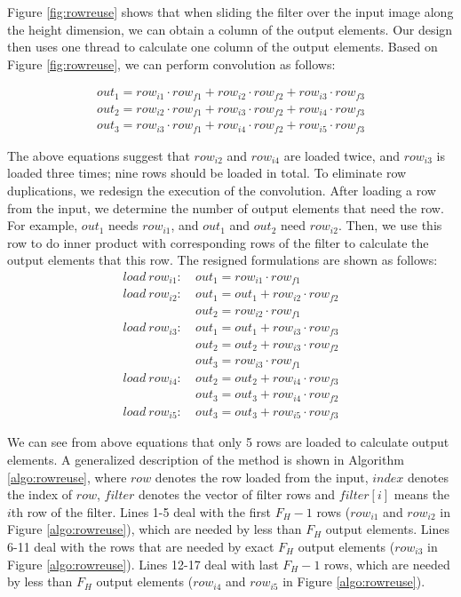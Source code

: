 Figure \ref{fig:rowreuse} shows that when sliding the filter over the input image along the height dimension, we can obtain a column of the output elements. Our design then uses one thread to calculate one column of the output elements. Based on Figure \ref{fig:rowreuse},
we can perform convolution as follows:

\begin{gather*}
  out_1=row_{i1} \cdot row_{f1} + row_{i2} \cdot row_{f2} + row_{i3} \cdot row_{f3} \\
out_{2}=row_{i2} \cdot row_{f1} + row_{i3} \cdot row_{f2} + row_{i4} \cdot row_{f3} \\
	out_{3}=row_{i3} \cdot row_{f1} + row_{i4} \cdot row_{f2} + row_{i5} \cdot row_{f3}
\end{gather*}

The above equations suggest that $row_{i2}$ and $row_{i4}$ are loaded twice, and $row_{i3}$ is loaded three times; nine rows should be loaded in total. To eliminate row duplications, we redesign the execution of the convolution. After loading a row from the input, we determine the number of output elements that need the row. For example, $out_1$ needs $row_{i1}$, and $out_1$ and $out_2$ need $row_{i2}$. Then, we use
this row to do inner product with corresponding rows of the filter to calculate the output elements that this row. The resigned formulations are shown as follows:
\begin{equation}\nonumber
\begin{aligned}
load\ row_{i1}:
&\ out_1=row_{i1} \cdot row_{f1} \\
load\ row_{i2}:
&\ out_1 = out_1+row_{i2} \cdot row_{f2}\\
&\ out_2=row_{i2} \cdot row_{f1}\\
load\ row_{i3}:
&\ out_1 = out_1+row_{i3} \cdot row_{f3}\\
&\ out_2 = out_2+row_{i3} \cdot row_{f2}\\
&\ out_{3}=row_{i3} \cdot row_{f1}\\
load\ row_{i4}:
&\ out_2=out_2+row_{i4} \cdot row_{f3} \\
&\ out_3=out_3+row_{i4} \cdot row_{f2}\\
load\ row_{i5}:
&\ out_3=out_3+row_{i5} \cdot row_{f3}
\end{aligned}	
\end{equation}



We can see from above equations that only 5 rows are loaded to calculate output elements. A generalized description of the method is
shown in Algorithm \ref{algo:rowreuse}, where $row$ denotes the row loaded from the input, $index$ denotes the index of $row$, $filter$ denotes
the vector of filter rows and $filter[i]$ means the $i$th row of the filter. Lines 1-5 deal with the first $F_H-1$ rows ($row_{i1}$ and $row_{i2}$ in Figure \ref{algo:rowreuse}), which
are needed by less than $F_H$ output elements. Lines 6-11 deal with the rows that are needed by exact $F_H$ output elements ($row_{i3}$ in
Figure \ref{algo:rowreuse}). Lines 12-17 deal with last $F_H-1$ rows, which are needed by less than $F_H$ output elements ($row_{i4}$
and $row_{i5}$ in Figure \ref{algo:rowreuse}).

